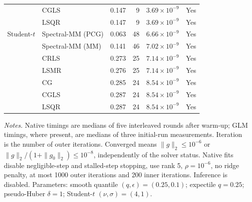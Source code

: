 \begin{longtable}{llrrrc}
 & CGLS & 0.147 & 9 & $3.69\times10^{-9}$ & Yes \\
 & LSQR & 0.147 & 9 & $3.69\times10^{-9}$ & Yes \\
\midrule
Student-$t$ & Spectral-MM (PCG) & 0.063 & 48 & $6.66\times10^{-9}$ & Yes \\
 & Spectral-MM (MM) & 0.141 & 46 & $7.02\times10^{-9}$ & Yes \\
 & CRLS & 0.273 & 25 & $7.14\times10^{-9}$ & Yes \\
 & LSMR & 0.276 & 25 & $7.14\times10^{-9}$ & Yes \\
 & CG & 0.285 & 24 & $8.54\times10^{-9}$ & Yes \\
 & CGLS & 0.287 & 24 & $8.54\times10^{-9}$ & Yes \\
 & LSQR & 0.287 & 24 & $8.54\times10^{-9}$ & Yes \\
\end{longtable}
\noindent\textit{Notes.} Native timings are medians of five interleaved rounds after warm-up; GLM timings, where present, are medians of three initial-run measurements. Iteration is the number of outer iterations. Converged means $\|g\|_2\leq10^{-6}$ or $\|g\|_2/(1+\|g_0\|_2)\leq10^{-8}$, independently of the solver status. Native fits disable negligible-step and stalled-step stopping, use rank 5, $\rho=10^{-6}$, no ridge penalty, at most 1000 outer iterations and 200 inner iterations. Inference is disabled.
Parameters: smooth quantile $(q,\epsilon)=(0.25,0.1)$; expectile $q=0.25$; pseudo-Huber $\delta=1$; Student-$t$ $(\nu,\sigma)=(4,1)$.
\par
\endgroup
